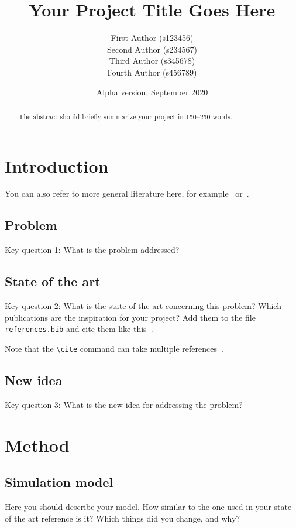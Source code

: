 \documentclass[a4paper,11pt]{article}
\title{Your Project Title Goes Here}
\author{
  First Author (s123456)
  \\
  Second Author (s234567)
  \\
  Third Author (s345678)
  \\
  Fourth Author (s456789)
}
\date{Alpha version, September 2020} %
\begin{document}
\maketitle

\begin{abstract}
The abstract should briefly summarize your project in 150--250 words.
\end{abstract}

\section{Introduction}

You can also refer to more general literature here, for example~\cite{WooldridgeMAS} or~\cite{wiki:SchellingSegregation}.

\subsection{Problem}

Key question 1: What is the problem addressed?

\subsection{State of the art}

Key question 2: What is the state of the art concerning this problem?
Which publications are the inspiration for your project?
Add them to the file \texttt{references.bib} and cite them like this~\cite{dWVV2013:ToM}.

Note that the \verb|\cite| command can take multiple references~\cite{vDGKK2019:ReachGossip,vdBerg2019:UnreliableGossip,HvKLL2019:SupermarketQ}.

\subsection{New idea}

Key question 3: What is the new idea for addressing the problem?

\section{Method}

\subsection{Simulation model}

Here you should describe your model.
How similar to the one used in your state of the art reference is it?
Which things did you change, and why?
\end{document}
